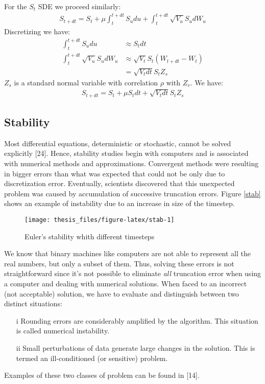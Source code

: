 \documentclass[12pt,twoside]{reedthesis}
\theoremstyle{definition}
\theoremstyle{definition}
\theoremstyle{remark}
\begin{document}
  For the \(S_t\) SDE we proceed similarly:
  \begin{align}
  \label{eq:heseuler}
  S_{t+dt} = S_t+ \mu \int_{t}^{t+dt}{ S_u du} + \int_{t}^{t+dt}{\sqrt{V_u} S_u dW_u}
  \end{align}
  Discretizing we have:
  \begin{align*}
   \int_{t}^{t+dt}{S_u} du &\approx S_t dt\\
   \int_{t}^{t+dt}{\sqrt{V_u} S_u} dW_u &\approx \sqrt{V_t} S_t (W_{t+dt}-W_t)\\
  &= \sqrt{V_t dt} S_t Z_s
  \end{align*}
  \(Z_s\) is a standard normal variable with correlation \(\rho\) with
  \(Z_v\). We have:
  \begin{align}
  S_{t+dt} = S_t + \mu S_t dt + \sqrt{V_t dt} S_t Z_s
  \end{align}
  \subsection{Stability}\label{stability}
  
  Most differential equations, deterministic or stochastic, cannot be
  solved explicitly {[}24{]}. Hence, stability studies begin with
  computers and is associated with numerical methods and approximations.
  Convergent methods were resulting in bigger errors than what was
  expected that could not be only due to discretization error. Eventually,
  scientists discovered that this unexpected problem was caused by
  accumulation of successive truncation errors. Figure \ref{stab} shows an
  example of instability due to an increase in size of the timestep.
  \begin{figure}
  
  {\centering \texttt{[image: thesis\_files/figure-latex/stab-1]} 
  
  }
  
  \caption{Euler's stability whith different timesteps \label{stab}}\label{fig:stab}
  \end{figure}
  We know that binary machines like computers are not able to represent
  all the real numbers, but only a subset of them. Thus, solving these
  errors is not straightforward since it's not possible to eliminate
  \emph{all} truncation error when using a computer and dealing with
  numerical solutions. When faced to an incorrect (not acceptable)
  solution, we have to evaluate and distinguish between two distinct
  situations:
  \begin{itemize}
    \item [i] Rounding errors are considerably amplified by the algorithm. This situation is called numerical instability.
    \item [ii] Small perturbations of data generate large changes in the solution. This is termed an ill-conditioned (or sensitive) problem.
  \end{itemize}
  Examples of these two classes of problem can be found in {[}14{]}.
  
\end{document}
